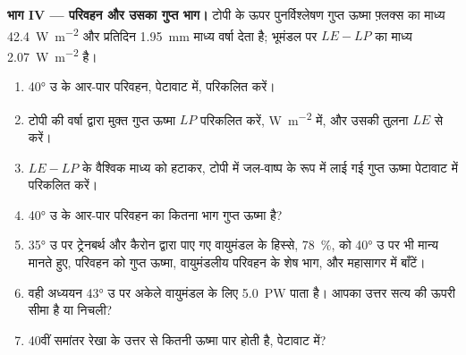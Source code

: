 \begin{problem}
\medskip
\noindent\textbf{भाग IV --- परिवहन और उसका गुप्त भाग।} टोपी के ऊपर पुनर्विश्लेषण गुप्त ऊष्मा फ़्लक्स का माध्य \qty{42.4}{W.m^{-2}} और प्रतिदिन \qty{1.95}{mm} माध्य वर्षा देता है; भूमंडल पर $LE - LP$ का माध्य
\qty{2.07}{W.m^{-2}} है।
\begin{enumerate}[resume]
  \item \ang{40} उ के आर-पार परिवहन, पेटावाट में, परिकलित करें।
  \item टोपी की वर्षा द्वारा मुक्त गुप्त ऊष्मा $LP$ परिकलित करें, \unit{W.m^{-2}} में, और उसकी तुलना $LE$ से करें।
  \item $LE - LP$ के वैश्विक माध्य को हटाकर, टोपी में जल-वाष्प के रूप में लाई गई गुप्त ऊष्मा पेटावाट में परिकलित करें।
  \item \ang{40} उ के आर-पार परिवहन का कितना भाग गुप्त ऊष्मा है?
  \item \ang{35} उ पर ट्रेनबर्थ और कैरोन द्वारा पाए गए वायुमंडल के हिस्से, \qty{78}{\percent}, को \ang{40} उ पर भी मान्य मानते हुए, परिवहन को गुप्त ऊष्मा, वायुमंडलीय परिवहन के शेष भाग, और महासागर में बाँटें।
  \item वही अध्ययन \ang{43} उ पर अकेले वायुमंडल के लिए \qty{5.0}{PW} पाता है। आपका उत्तर सत्य की ऊपरी सीमा है या निचली?
  \item 40वीं समांतर रेखा के उत्तर से कितनी ऊष्मा पार होती है, पेटावाट में?
\end{enumerate}
\end{problem}

